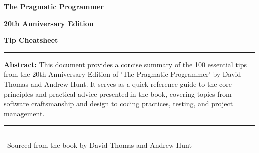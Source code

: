 \documentclass[11pt]{article}
\begin{document}
\thispagestyle{empty} %
\begin{center}
    {\Huge\bfseries The Pragmatic Programmer\par}
    {\Large\bfseries 20th Anniversary Edition\par}
    \vspace{2cm}
    {\Huge\bfseries Tip Cheatsheet\par} %
    \vspace{3cm}

    \begin{minipage}{0.8\textwidth} %
        \large %
        \hrule %
        \vspace{0.5em} %
        \textbf{Abstract:} This document provides a concise summary of the 100 essential tips from the 20th Anniversary Edition of 'The Pragmatic Programmer' by David Thomas and Andrew Hunt. It serves as a quick reference guide to the core principles and practical advice presented in the book, covering topics from software craftsmanship and design to coding practices, testing, and project management.
        \vspace{0.5em} %
        \hrule %
    \end{minipage}

    \vfill %
    \rule{\textwidth}{0.4pt} %
    \ Sourced from the book by David Thomas and Andrew Hunt
\end{center}
\clearpage %

\pagestyle{fancy} %
\end{document}
